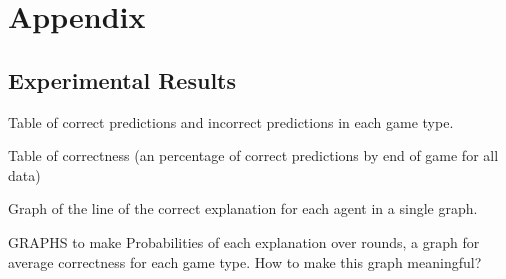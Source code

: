 \documentclass[parskip]{cs4rep}
\begin{document}
\chapter{Appendix}

\section{Experimental Results}

Table of correct predictions and incorrect predictions in each game type.

Table of correctness (an percentage of correct predictions by end of game for all data)

Graph of the line of the correct explanation for each agent in a single graph.

GRAPHS to make
Probabilities of each explanation over rounds, a graph for average correctness for each game type.
How to make this graph meaningful?



\end{document}
